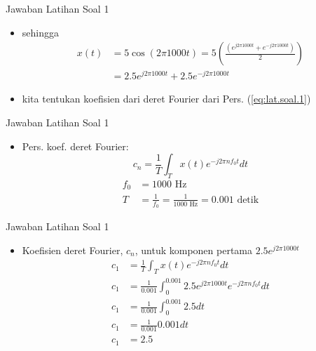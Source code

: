 \documentclass[pdflatex,compress,mathserif]{beamer}
\begin{document}
\begin{frame}{Jawaban Latihan Soal 1}
    \begin{itemize}
        \item sehingga
        \begin{align}
            x(t) &= 5 \cos (2 \pi 1000 t) = 5 \left( \frac{(e^{j2\pi 1000t} + e^{-j2\pi 1000t})}{2} \right) \\
            &= 2.5 e^{j2 \pi 1000t} + 2.5 e^{-j2 \pi 1000t}
            \label{eq:lat.soal.1}
        \end{align}
        \item kita tentukan koefisien dari deret Fourier dari Pers. (\ref{eq:lat.soal.1})
    \end{itemize}
\end{frame}

\begin{frame}{Jawaban Latihan Soal 1}
    \begin{itemize}
        \item Pers. koef. deret Fourier:
        \begin{equation}
            c_n = \frac{1}{T} \int_T x(t) e^{-j 2 \pi n f_0 t} dt
        \end{equation}
        \begin{align*}
            f_0 &= 1000 \text{ Hz}\\
            T &= \frac{1}{f_0} = \frac{1}{1000 \text{ Hz}} = 0.001 \text{ detik}
        \end{align*}
    \end{itemize}
\end{frame}

\begin{frame}{Jawaban Latihan Soal 1}
    \begin{itemize}
        \item Koefisien deret Fourier, $c_n$, untuk komponen pertama $2.5 e^{j2 \pi 1000t}$
        \begin{align*}
            c_1 &= \frac{1}{T} \int_T x(t) e^{-j 2 \pi n f_0 t} dt \\
            c_1 &= \frac{1}{0.001} \int_0^{0.001} 2.5 e^{j2 \pi 1000t} e^{-j 2 \pi n f_0 t} dt \\
            c_1 &= \frac{1}{0.001} \int_0^{0.001} 2.5 dt \\
            c_1 &= \frac{1}{0.001} 0.001 dt \\
            c_1 &= 2.5
        \end{align*}
    \end{itemize}
\end{frame}
\end{document}
